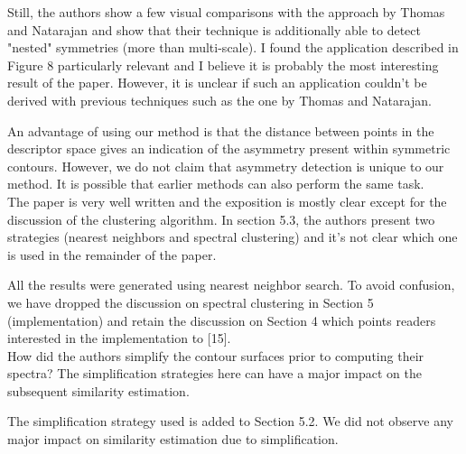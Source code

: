 \documentclass[10pt]{article}
\begin{document}
   Still, the authors show a few visual comparisons with the approach by
   Thomas and Natarajan and show that their technique is additionally able
   to detect "nested" symmetries (more than multi-scale).
   I found the application described in Figure 8 particularly relevant and I
   believe it is probably the most interesting result of the paper. However,
   it is unclear if such an application couldn't be derived with previous
   techniques such as the one by Thomas and Natarajan.

   {\color{blue}An advantage of using our method is that the distance between
	   points in the descriptor space gives an indication of the asymmetry
	   present within symmetric contours. However, we do not claim that
	   asymmetry detection is unique to our method. It is possible that
   earlier methods can also perform the same task.}\\

The paper is very well written and the exposition is mostly clear except
   for the discussion of the clustering algorithm. In section 5.3, the
   authors present two strategies (nearest neighbors and spectral
   clustering) and it's not clear which one is used in the remainder of the
   paper.

   {\color{blue}All the results were generated using nearest neighbor search.
	   To avoid confusion, we have dropped the discussion on spectral
	   clustering in Section 5 (implementation) and retain the discussion
	   on Section 4 which points readers interested in the implementation
   to [15].}\\
   
   How did the authors simplify the contour surfaces prior to computing
   their spectra? The simplification strategies here can have a major impact
   on the subsequent similarity estimation.

   {\color{blue}The simplification strategy used is added to Section 5.2. We did not observe
   any major impact on similarity estimation due to simplification.}\\
\end{document}
